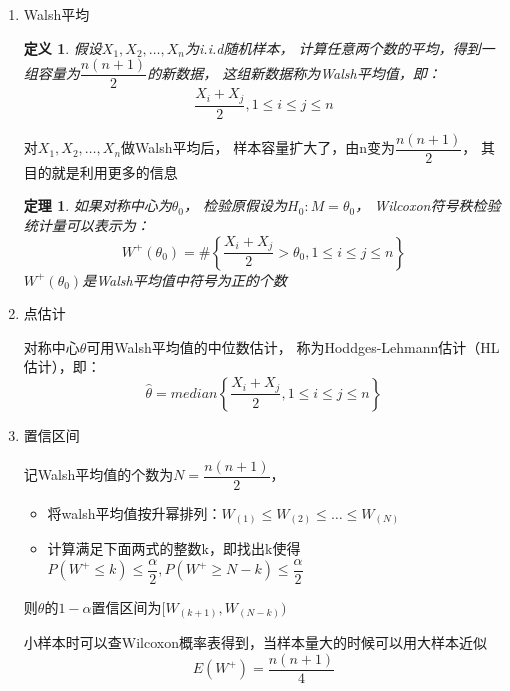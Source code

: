 \documentclass[UTF8]{ctexart}
\numberwithin{equation}{section}
\newtheorem{thm}{定理}[section]
\newtheorem{definition}{定义}[section]
\begin{document}
\begin{enumerate}
    \item Walsh平均
    \begin{definition}
        假设$X_1, X_2, \dots,X_n$为i.i.d随机样本，
        计算任意两个数的平均，得到一组容量为$\dfrac{n(n+1)}{2}$的新数据，
        这组新数据称为Walsh平均值，即：
        \begin{equation}
            \dfrac{X_i+X_j}{2},1 \leq i \leq j \leq n
            \nonumber
        \end{equation}
    \end{definition}
    对$X_1, X_2, \dots,X_n$做Walsh平均后，
    样本容量扩大了，由n变为$\dfrac{n(n+1)}{2}$，
    其目的就是利用更多的信息
    \begin{thm}
        如果对称中心为$\theta_0$，
        检验原假设为$H_0: M = \theta_0$，
        Wilcoxon符号秩检验统计量可以表示为：
        \begin{equation}
            W^+(\theta_0) = \# \left\{ \dfrac{X_i+X_j}{2} > \theta_0, 1 \leq i \leq j \leq n \right\}
            \nonumber
        \end{equation}
        $W^+(\theta_0)$是Walsh平均值中符号为正的个数
    \end{thm}

    \item 点估计
    
    对称中心$\theta$可用Walsh平均值的中位数估计，
    称为Hoddges-Lehmann估计（HL估计），即：
    \begin{equation}
        \hat{\theta} = median \left\{ \dfrac{X_i+X_j}{2} , 1 \leq i \leq j \leq n \right\}
        \nonumber
    \end{equation}

    \item 置信区间
    
    记Walsh平均值的个数为$N = \dfrac{n(n+1)}{2}$，
    \begin{itemize}
        \item 将walsh平均值按升幂排列：$W_{(1)} \leq W_{(2)} \leq \dots \leq W_{(N)}$
        \item 计算满足下面两式的整数k，即找出k使得$P(W^+ \leq k) \leq \dfrac{\alpha}{2},P(W^+ \geq N-k) \leq \dfrac{\alpha}{2}$
    \end{itemize}
    则$\theta$的$1-\alpha$置信区间为$[W_{(k+1)}, W_{(N-k)})$

    小样本时可以查Wilcoxon概率表得到，当样本量大的时候可以用大样本近似
    \begin{equation}
        E(W^+) = \dfrac{n(n+1)}{4}
        \nonumber
    \end{equation}


\end{enumerate}
\end{document}
